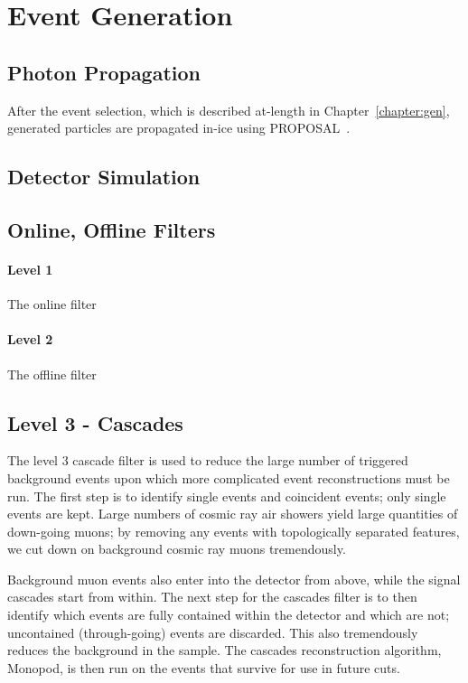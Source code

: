 \documentclass[main.tex]{subfiles}
\begin{document}
\section{Event Generation}

\subsection{Photon Propagation}

After the event selection, which is described at-length in Chapter~\ref{chapter:gen}, generated particles are propagated in-ice using PROPOSAL~\cite{Koehne:2013gpa}. 

\subsection{Detector Simulation}

\subsection{Online, Offline Filters}

\paragraph{Level 1}

The online filter

\paragraph{Level 2}

The offline filter 

\subsection{Level 3 - Cascades}

The level 3 cascade filter is used to reduce the large number of triggered background events upon which more complicated event reconstructions must be run. 
The first step is to identify single events and coincident events; only single events are kept. 
Large numbers of cosmic ray air showers yield large quantities of down-going muons; by removing any events with topologically separated features, we cut down on background cosmic ray muons tremendously. 

Background muon events also enter into the detector from above, while the signal cascades start from within.
The next step for the cascades filter is to then identify which events are fully contained within the detector and which are not; uncontained (through-going) events are discarded. 
This also tremendously reduces the background in the sample. 
The cascades reconstruction algorithm, Monopod, is then run on the events that survive for use in future cuts. 
\end{document}
